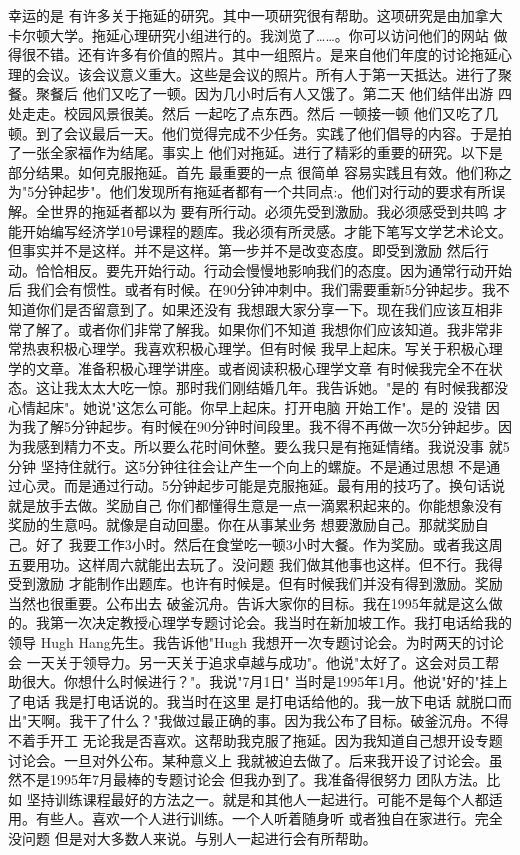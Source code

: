 幸运的是 有许多关于拖延的研究。其中一项研究很有帮助。这项研究是由加拿大卡尔顿大学。拖延心理研究小组进行的。我浏览了……。你可以访问他们的网站 做得很不错。还有许多有价值的照片。其中一组照片。是来自他们年度的讨论拖延心理的会议。该会议意义重大。这些是会议的照片。所有人于第一天抵达。进行了聚餐。聚餐后 他们又吃了一顿。因为几小时后有人又饿了。第二天 他们结伴出游 四处走走。校园风景很美。然后 一起吃了点东西。然后 一顿接一顿 他们又吃了几顿。到了会议最后一天。他们觉得完成不少任务。实践了他们倡导的内容。于是拍了一张全家福作为结尾。事实上 他们对拖延。进行了精彩的重要的研究。以下是部分结果。如何克服拖延。首先 最重要的一点 很简单 容易实践且有效。他们称之为"5分钟起步"。他们发现所有拖延者都有一个共同点:。他们对行动的要求有所误解。全世界的拖延者都以为 要有所行动。必须先受到激励。我必须感受到共鸣 才能开始编写经济学10号课程的题库。我必须有所灵感。才能下笔写文学艺术论文。但事实并不是这样。并不是这样。第一步并不是改变态度。即受到激励 然后行动。恰恰相反。要先开始行动。行动会慢慢地影响我们的态度。因为通常行动开始后 我们会有惯性。或者有时候。在90分钟冲刺中。我们需要重新5分钟起步。我不知道你们是否留意到了。如果还没有 我想跟大家分享一下。现在我们应该互相非常了解了。或者你们非常了解我。如果你们不知道 我想你们应该知道。我非常非常热衷积极心理学。我喜欢积极心理学。但有时候 我早上起床。写关于积极心理学的文章。准备积极心理学讲座。或者阅读积极心理学文章 有时候我完全不在状态。这让我太太大吃一惊。那时我们刚结婚几年。我告诉她。"是的 有时候我都没心情起床"。她说"这怎么可能。你早上起床。打开电脑 开始工作"。是的 没错 因为我了解5分钟起步。有时候在90分钟时间段里。我不得不再做一次5分钟起步。因为我感到精力不支。所以要么花时间休整。要么我只是有拖延情绪。我说没事 就5分钟 坚持住就行。这5分钟往往会让产生一个向上的螺旋。不是通过思想 不是通过心灵。而是通过行动。5分钟起步可能是克服拖延。最有用的技巧了。换句话说 就是放手去做。奖励自己 你们都懂得生意是一点一滴累积起来的。你能想象没有奖励的生意吗。就像是自动回墨。你在从事某业务 想要激励自己。那就奖励自己。好了 我要工作3小时。然后在食堂吃一顿3小时大餐。作为奖励。或者我这周五要用功。这样周六就能出去玩了。没问题 我们做其他事也这样。但不行。我得受到激励 才能制作出题库。也许有时候是。但有时候我们并没有得到激励。奖励当然也很重要。公布出去 破釜沉舟。告诉大家你的目标。我在1995年就是这么做的。我第一次决定教授心理学专题讨论会。我当时在新加坡工作。我打电话给我的领导 Hugh Hang先生。我告诉他"Hugh 我想开一次专题讨论会。为时两天的讨论会 一天关于领导力。另一天关于追求卓越与成功"。他说"太好了。这会对员工帮助很大。你想什么时候进行？"。我说"7月1日" 当时是1995年1月。他说"好的"挂上了电话 我是打电话说的。我当时在这里 是打电话给他的。我一放下电话 就脱口而出"天啊。我干了什么？"我做过最正确的事。因为我公布了目标。破釜沉舟。不得不着手开工 无论我是否喜欢。这帮助我克服了拖延。因为我知道自己想开设专题讨论会。一旦对外公布。某种意义上 我就被迫去做了。后来我开设了讨论会。虽然不是1995年7月最棒的专题讨论会 但我办到了。我准备得很努力 团队方法。比如 坚持训练课程最好的方法之一。就是和其他人一起进行。可能不是每个人都适用。有些人。喜欢一个人进行训练。一个人听着随身听 或者独自在家进行。完全没问题 但是对大多数人来说。与别人一起进行会有所帮助。 

